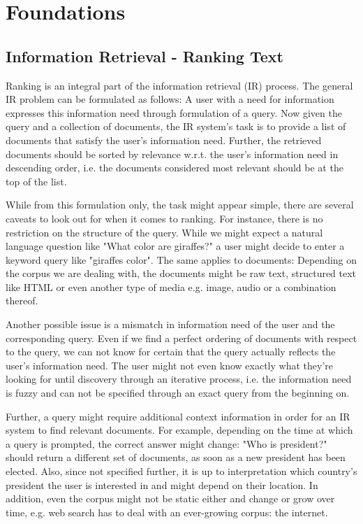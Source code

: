 \chapter{Foundations}
\label{foundations}
\section{Information Retrieval - Ranking Text}
Ranking is an integral part of the information retrieval (IR) process. The general IR problem can be formulated as follows: A user with a need for information expresses this information need through formulation of a query. Now given the query and a collection of documents, the IR system's task is to provide a list of documents that satisfy the user's information need. Further, the retrieved documents should be sorted by relevance w.r.t. the user's information need in descending order, i.e. the documents considered most relevant should be at the top of the list.

While from this formulation only, the task might appear simple, there are several caveats to look out for when it comes to ranking. For instance, there is no restriction on the structure of the query. While we might expect a natural language question like "What color are giraffes?" a user might decide to enter a keyword query like "giraffes color". The same applies to documents: Depending on the corpus we are dealing with, the documents might be raw text, structured text like HTML or even another type of media e.g. image, audio or a combination thereof.

Another possible issue is a mismatch in information need of the user and the corresponding query. Even if we find a perfect ordering of documents with respect to the query, we can not know for certain that the query actually reflects the user's information need. The user might not even know exactly what they're looking for until discovery through an iterative process, i.e. the information need is fuzzy and can not be specified through an exact query from the beginning on.

Further, a query might require additional context information in order for an IR system to find relevant documents. For example, depending on the time at which a query is prompted, the correct answer might change: "Who is president?" should return a different set of documents, as soon as a new president has been elected. Also, since not specified further, it is up to interpretation which country's president the user is interested in and might depend on their location.
In addition, even the corpus might not be static either and change or grow over time, e.g. web search has to deal with an ever-growing corpus: the internet.

